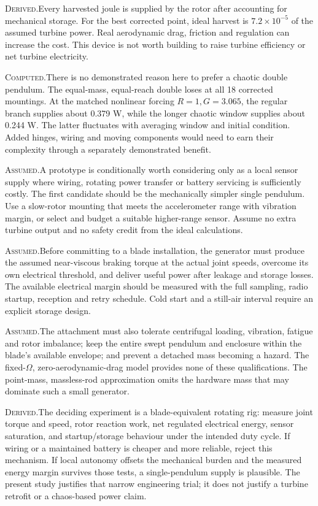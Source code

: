 \documentclass[10pt,a4paper]{article}
\newcommand{\D}{\textcolor{accent}{\textsc{Derived.}}\enspace}
\newcommand{\C}{\textcolor{accent}{\textsc{Computed.}}\enspace}
\newcommand{\A}{\textcolor{accent}{\textsc{Assumed.}}\enspace}
\begin{document}
\D Every harvested joule is supplied by the rotor after accounting for mechanical storage. For the best corrected point, ideal harvest is $\ensuremath{7.2\times10^{-5}}$ of the assumed turbine power. Real aerodynamic drag, friction and regulation can increase the cost. This device is not worth building to raise turbine efficiency or net turbine electricity.

\C There is no demonstrated reason here to prefer a chaotic double pendulum. The equal-mass, equal-reach double loses at all 18 corrected mountings. At the matched nonlinear forcing $R=1,G=3.065$, the regular branch supplies about 0.379 W, while the longer chaotic window supplies about 0.244 W. The latter fluctuates with averaging window and initial condition. Added hinges, wiring and moving components would need to earn their complexity through a separately demonstrated benefit.

\A A prototype is conditionally worth considering only as a local sensor supply where wiring, rotating power transfer or battery servicing is sufficiently costly. The first candidate should be the mechanically simpler single pendulum. Use a slow-rotor mounting that meets the accelerometer range with vibration margin, or select and budget a suitable higher-range sensor. Assume no extra turbine output and no safety credit from the ideal calculations.

\A Before committing to a blade installation, the generator must produce the assumed near-viscous braking torque at the actual joint speeds, overcome its own electrical threshold, and deliver useful power after leakage and storage losses. The available electrical margin should be measured with the full sampling, radio startup, reception and retry schedule. Cold start and a still-air interval require an explicit storage design.

\A The attachment must also tolerate centrifugal loading, vibration, fatigue and rotor imbalance; keep the entire swept pendulum and enclosure within the blade's available envelope; and prevent a detached mass becoming a hazard. The fixed-$\Omega$, zero-aerodynamic-drag model provides none of these qualifications. The point-mass, massless-rod approximation omits the hardware mass that may dominate such a small generator.

\D The deciding experiment is a blade-equivalent rotating rig: measure joint torque and speed, rotor reaction work, net regulated electrical energy, sensor saturation, and startup/storage behaviour under the intended duty cycle. If wiring or a maintained battery is cheaper and more reliable, reject this mechanism. If local autonomy offsets the mechanical burden and the measured energy margin survives those tests, a single-pendulum supply is plausible. The present study justifies that narrow engineering trial; it does not justify a turbine retrofit or a chaos-based power claim.
\end{document}
